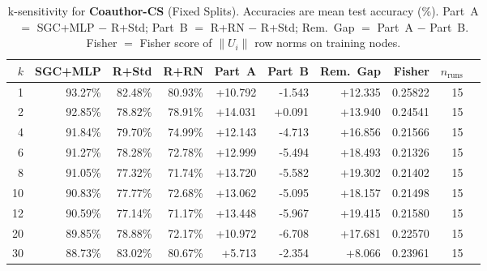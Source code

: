\begin{table}[t]
\centering\small\setlength{\tabcolsep}{5pt}
\caption{k-sensitivity for \textbf{Coauthor-CS} (Fixed Splits). Accuracies are mean test accuracy (\%). Part~A $=$ SGC+MLP $-$ R+Std; Part~B $=$ R+RN $-$ R+Std; Rem.~Gap $=$ Part~A $-$ Part~B. Fisher $=$ Fisher score of $\|U_i\|$ row norms on training nodes.}
\label{tab:exp8_per_dataset_coauthor-cs_fixed}
\begin{tabular}{rrrrrrrrrr}
\toprule
$k$ & SGC+MLP & R+Std & R+RN & Part~A & Part~B & Rem.~Gap & Fisher & $n_{\mathrm{runs}}$ \\
\midrule
1 & 93.27\% & 82.48\% & 80.93\% & +10.792 & -1.543 & +12.335 & 0.25822 & 15 \\
2 & 92.85\% & 78.82\% & 78.91\% & +14.031 & +0.091 & +13.940 & 0.24541 & 15 \\
4 & 91.84\% & 79.70\% & 74.99\% & +12.143 & -4.713 & +16.856 & 0.21566 & 15 \\
6 & 91.27\% & 78.28\% & 72.78\% & +12.999 & -5.494 & +18.493 & 0.21326 & 15 \\
8 & 91.05\% & 77.32\% & 71.74\% & +13.720 & -5.582 & +19.302 & 0.21402 & 15 \\
10 & 90.83\% & 77.77\% & 72.68\% & +13.062 & -5.095 & +18.157 & 0.21498 & 15 \\
12 & 90.59\% & 77.14\% & 71.17\% & +13.448 & -5.967 & +19.415 & 0.21580 & 15 \\
20 & 89.85\% & 78.88\% & 72.17\% & +10.972 & -6.708 & +17.681 & 0.22570 & 15 \\
30 & 88.73\% & 83.02\% & 80.67\% & +5.713 & -2.354 & +8.066 & 0.23961 & 15 \\
\bottomrule
\end{tabular}
\end{table}
